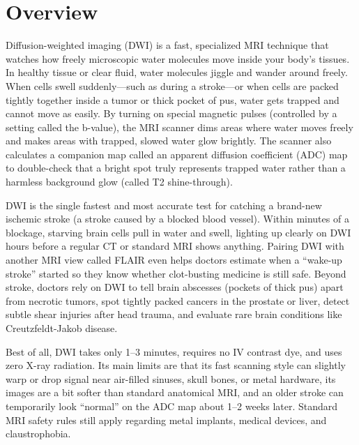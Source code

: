 \label{ch:infographic-dwi}

\section{Overview}

Diffusion-weighted imaging (DWI) is a fast, specialized MRI technique that watches how freely microscopic water molecules move inside your body's tissues. In healthy tissue or clear fluid, water molecules jiggle and wander around freely. When cells swell suddenly---such as during a stroke---or when cells are packed tightly together inside a tumor or thick pocket of pus, water gets trapped and cannot move as easily. By turning on special magnetic pulses (controlled by a setting called the b-value), the MRI scanner dims areas where water moves freely and makes areas with trapped, slowed water glow brightly. The scanner also calculates a companion map called an apparent diffusion coefficient (ADC) map to double-check that a bright spot truly represents trapped water rather than a harmless background glow (called T2 shine-through).

DWI is the single fastest and most accurate test for catching a brand-new ischemic stroke (a stroke caused by a blocked blood vessel). Within minutes of a blockage, starving brain cells pull in water and swell, lighting up clearly on DWI hours before a regular CT or standard MRI shows anything. Pairing DWI with another MRI view called FLAIR even helps doctors estimate when a ``wake-up stroke'' started so they know whether clot-busting medicine is still safe. Beyond stroke, doctors rely on DWI to tell brain abscesses (pockets of thick pus) apart from necrotic tumors, spot tightly packed cancers in the prostate or liver, detect subtle shear injuries after head trauma, and evaluate rare brain conditions like Creutzfeldt-Jakob disease.

Best of all, DWI takes only 1--3 minutes, requires no IV contrast dye, and uses zero X-ray radiation. Its main limits are that its fast scanning style can slightly warp or drop signal near air-filled sinuses, skull bones, or metal hardware, its images are a bit softer than standard anatomical MRI, and an older stroke can temporarily look ``normal'' on the ADC map about 1--2 weeks later. Standard MRI safety rules still apply regarding metal implants, medical devices, and claustrophobia.

